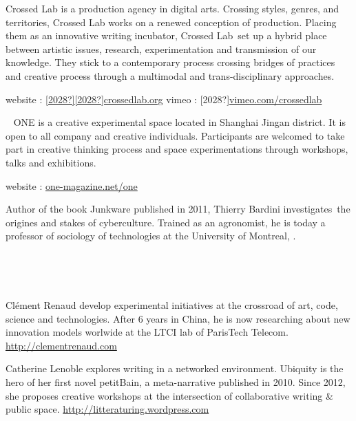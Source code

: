 Crossed Lab is a production agency in digital arts. Crossing styles,
genres, and territories, Crossed Lab works on a renewed conception of
production. Placing them as an innovative writing incubator, Crossed
Lab~set up a hybrid place between artistic issues, research,
experimentation and transmission of our knowledge. They stick to a
contemporary process crossing bridges of practices and creative process
through a multimodal and trans-disciplinary approaches.

website :
\href{http://www.crossedlab.org/}{[2028?][2028?]crossedlab.org}\newline
vimeo :
[2028?]\href{http://vimeo.com/crossedlab}{vimeo.com/crossedlab}\newline
~

~\newline
ONE is a creative experimental space located in Shanghai Jingan
district. It is open to all company and creative individuals.
Participants are welcomed to take part in creative thinking process and
space experimentations through workshops, talks and exhibitions.~

website : \href{http://one-magazine.net/one/}{one-magazine.net/one}


\bigskip

Author of the book Junkware published in 2011, Thierry Bardini
investigates~the origines and stakes of cyberculture.\newline
Trained as an agronomist, he is today a professor of sociology of
technologies at the University of Montreal, .

~

~


\bigskip

Cl\'ement Renaud develop experimental initiatives at the crossroad of
art, code, science and technologies. After 6 years in China, he is now
researching about new innovation models worlwide at the LTCI lab of
ParisTech Telecom.\newline
\href{http://clementrenaud.com/}{http://clementrenaud.com}

\newline
{}Catherine Lenoble explores writing in a networked environment. Ubiquity
is the hero of her first novel petitBain, a meta-narrative published in
2010. Since 2012, she proposes creative workshops at the intersection
of collaborative writing \& public space.\newline
\href{http://litteraturing.wordpress.com/}{http://litteraturing.wordpress.com}

